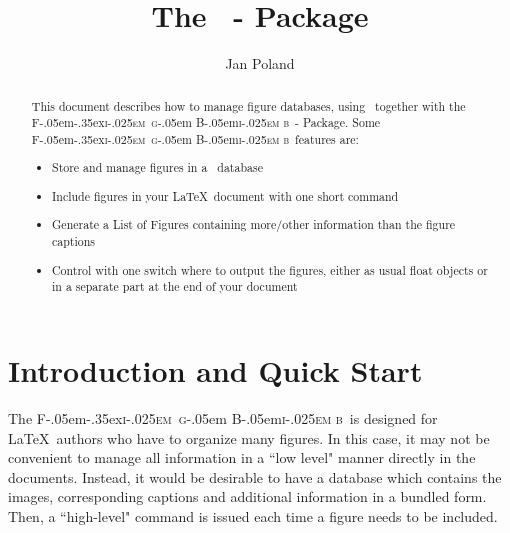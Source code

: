 \documentclass{ltxdoc}
\title{The \FigBib\ - Package}
\author{Jan Poland}
\def\FigBib{{\rmfamily F\kern-.05em\lower-.35ex\hbox{\textsc{i\kern-.025em g}}\kern-.05em%
    B\kern-.05em\textsc{i\kern-.025em b}}}
\begin{document}
\maketitle

\begin{abstract}
\noindent This document describes how to manage figure databases, using
\BibTeX\ together with the \FigBib\ - Package. Some \FigBib\ features
are:
\begin{itemize}
\item Store and manage figures in a \BibTeX\ database
\item Include figures in your \LaTeX\ document with one short
command
\item Generate a List of Figures containing more/other
information than the figure captions
\item Control with one switch where to output the figures, either
as usual float objects or in a separate part at the end of your
document
\end{itemize}
\end{abstract}

\section{Introduction and Quick Start}

The \FigBib\ is designed for \LaTeX\ authors who have to organize
many figures. In this case, it may not be convenient to manage all
information in a ``low level" manner directly in the documents.
Instead, it would be desirable to have a database which contains
the images, corresponding captions and additional information in a
bundled form. Then, a ``high-level" command is issued each time a
figure needs to be included.
\end{document}
